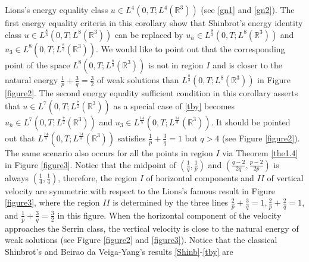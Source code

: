 \documentclass[11pt]{article}
\theoremstyle{plain}\newtheorem{definition}{Definition}[section]
\theoremstyle{definition}\newtheorem{theorem}{Theorem}[section]
\theoremstyle{plain}\newtheorem{lemma}[theorem]{Lemma}
\theoremstyle{plain}\newtheorem{coro}[theorem]{Corollary}
\theoremstyle{plain}\newtheorem{prop}[theorem]{Proposition}
\theoremstyle{remark}\newtheorem{remark}{Remark}[section]
\newcommand{\f}{\frac}
\numberwithin{equation}{section}
\begin{document}
Lions's energy equality class  $ u \in L^{4}(0,T;L^{4}(\mathbb{R}^{3}))$ (see \eqref{gn1} and \eqref{gn2}).
  The first energy equality criteria in this corollary show  that Shinbrot's energy identity class $u\in L^{\f{8}{3}}(0,T;L^{  8 } (\mathbb{R}^{3}))$
can be replaced by
$u_h\in L^{\f{8}{3}}(0,T;L^{  8 }(\mathbb{R}^{3}) )$ and  $u_3\in L^{ 8}(0,T;L^{\f{8}{3} } (\mathbb{R}^{3}))$.
We would like to point out that the corresponding point of the space $
L^{ 8}(0,T;L^{\f{8}{3} } (\mathbb{R}^{3}))$ is not in region  $I$ and is closer to the natural energy $\f{1}{p}+
 \f{3}{q}=\f32$  of weak solutions than $L^{\f{8}{3}}(0,T;L^{  8 } (\mathbb{R}^{3}))$ in Figure \ref{figure2}.
 The second  energy equality sufficient condition  in  this corollary   asserts that  $u\in   L^{ 7}(0,T;L^{\f{7}{2}} (\mathbb{R}^{3}))$ as a special case of  \eqref{tby} becomes $u_h\in   L^{ 7}(0,T;L^{\f{7}{2} } (\mathbb{R}^{3}))$ and
$u_3\in   L^{ \f{14}{5}}(0,T;L^{\f{14}{3} } (\mathbb{R}^{3}))$. It should be pointed out that
$   L^{ \f{14}{5}}(0,T;L^{\f{14}{3} } (\mathbb{R}^{3}))$ satisfies $\f{1}{p }+
 \f{3}{q }=1$ but $q>4$ (see Figure \ref{figure2}).
%
 The same  scenario also occurs for all the points in region  $I$ via Theorem \ref{the1.4} in  Figure \ref{figure3}.
 Notice that the midpoint of  $(\f{1}{q},\f{1}{p})$ and $(\f{q-2}{2q},\f{p-2}{2p})$ is  always $(\f{1}{4},\f{1}{4})$, therefore, the region $I$ of  horizontal components  and $II$ of  vertical velocity  are symmetric with
 respect to the Lions's famous result in  Figure \ref{figure3}, where the region $II$ is determined  by the three lines $\f2p+\f3q=1,  \f{2}{p}+
 \f{2}{q}=1$, and $\f{1}{p}+
 \f{3}{q}=\f32$ in this figure. When the horizontal component of the velocity approaches the Serrin class, the vertical velocity is close to the natural energy of weak solutions (see Figure \ref{figure2} and \ref{figure3}).
Notice that the classical Shinbrot's and Beirao da Veiga-Yang's results \eqref{Shinb}-\eqref{tby} are
\end{document}
